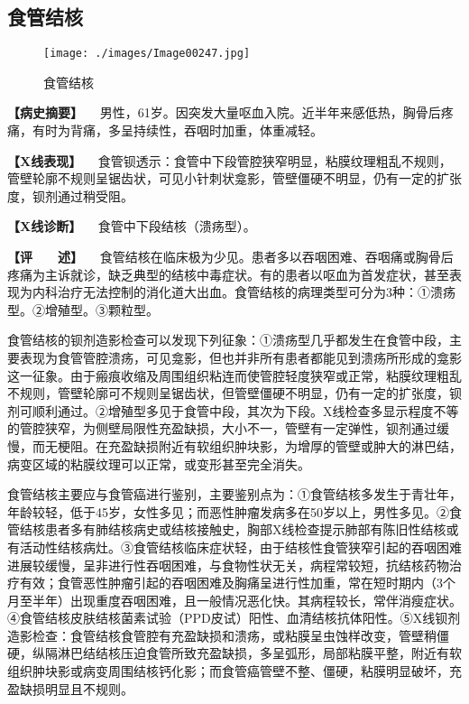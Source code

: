 \subsection{食管结核}

\begin{figure}[!htbp]
 \centering
 \texttt{[image: ./images/Image00247.jpg]}
 \captionsetup{justification=centering}
 \caption{食管结核}
 \label{fig5-2-4}
  \end{figure} 

\textbf{【病史摘要】}
　男性，61岁。因突发大量呕血入院。近半年来感低热，胸骨后疼痛，有时为背痛，多呈持续性，吞咽时加重，体重减轻。

\textbf{【X线表现】}
　食管钡透示：食管中下段管腔狭窄明显，粘膜纹理粗乱不规则，管壁轮廓不规则呈锯齿状，可见小针刺状龛影，管壁僵硬不明显，仍有一定的扩张度，钡剂通过稍受阻。

\textbf{【X线诊断】} 　食管中下段结核（溃疡型）。

\textbf{【评　　述】}
　食管结核在临床极为少见。患者多以吞咽困难、吞咽痛或胸骨后疼痛为主诉就诊，缺乏典型的结核中毒症状。有的患者以呕血为首发症状，甚至表现为内科治疗无法控制的消化道大出血。食管结核的病理类型可分为3种：①溃疡型。②增殖型。③颗粒型。

食管结核的钡剂造影检查可以发现下列征象：①溃疡型几乎都发生在食管中段，主要表现为食管管腔溃疡，可见龛影，但也并非所有患者都能见到溃疡所形成的龛影这一征象。由于瘢痕收缩及周围组织粘连而使管腔轻度狭窄或正常，粘膜纹理粗乱不规则，管壁轮廓可不规则呈锯齿状，但管壁僵硬不明显，仍有一定的扩张度，钡剂可顺利通过。②增殖型多见于食管中段，其次为下段。X线检查多显示程度不等的管腔狭窄，为侧壁局限性充盈缺损，大小不一，管壁有一定弹性，钡剂通过缓慢，而无梗阻。在充盈缺损附近有软组织肿块影，为增厚的管壁或肿大的淋巴结，病变区域的粘膜纹理可以正常，或变形甚至完全消失。

食管结核主要应与食管癌进行鉴别，主要鉴别点为：①食管结核多发生于青壮年，年龄较轻，低于45岁，女性多见；而恶性肿瘤发病多在50岁以上，男性多见。②食管结核患者多有肺结核病史或结核接触史，胸部X线检查提示肺部有陈旧性结核或有活动性结核病灶。③食管结核临床症状轻，由于结核性食管狭窄引起的吞咽困难进展较缓慢，呈非进行性吞咽困难，与食物性状无关，病程常较短，抗结核药物治疗有效；食管恶性肿瘤引起的吞咽困难及胸痛呈进行性加重，常在短时期内（3个月至半年）出现重度吞咽困难，且一般情况恶化快。其病程较长，常伴消瘦症状。④食管结核皮肤结核菌素试验（PPD皮试）阳性、血清结核抗体阳性。⑤X线钡剂造影检查：食管结核食管腔有充盈缺损和溃疡，或粘膜呈虫蚀样改变，管壁稍僵硬，纵隔淋巴结结核压迫食管所致充盈缺损，多呈弧形，局部粘膜平整，附近有软组织肿块影或病变周围结核钙化影；而食管癌管壁不整、僵硬，粘膜明显破坏，充盈缺损明显且不规则。

